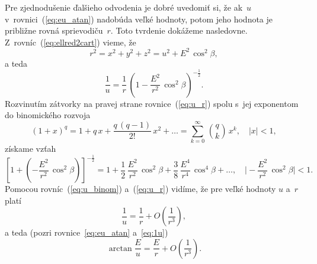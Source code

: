 \documentclass[a4paper, 12pt]{book}
\begin{document}
Pre zjednodušenie ďalšieho odvodenia je dobré uvedomiť si, že ak~$u$ 
v~rovnici~(\ref{eq:eu_atan}) nadobúda veľké hodnoty, potom jeho hodnota je 
približne rovná sprievodiču~$r$.  Toto tvrdenie dokážeme nasledovne.  
Z~rovníc~(\ref{eq:ellred2cart}) vieme, že
%
\begin{equation}
r^2 = x^2 + y^2 + z^2 = u^2 + E^2 \, \cos^2\beta{,}
\end{equation}
%
a teda
%
\begin{equation}
\label{eq:u_r}
\frac{1}{u} = \frac{1}{r} \, \left( 1 - \frac{E^2}{r^2} \, \cos^2\beta 
\right)^{-\frac{1}{2}}{.}
\end{equation}
%
Rozvinutím zátvorky na pravej strane rovnice~(\ref{eq:u_r}) spolu s~jej 
exponentom do binomického rozvoja \parencite[pozri napríklad][]{Gradshteyn2007}
%
\begin{equation}
(1 + x)^q = 1 + q \, x + \frac{q \, (q - 1)}{2!} \, x^2 + \dots = \sum_{k 
= 0}^{\infty} \, \binom{q}{k} \, x^k{,} \quad | x | < 1{,}
\end{equation}
%
získame vzťah
%
\begin{equation}
\label{eq:u_binom}
\left[ 1 + \left( - \frac{E^2}{r^2} \, \cos^2\beta \right) 
\right]^{-\frac{1}{2}} = 1 + \frac{1}{2} \, \frac{E^2}{r^2} \, \cos^2\beta 
+ \frac{3}{8} \, \frac{E^4}{r^4} \, \cos^4\beta + \dots{,} \quad \bigg\lvert 
-\frac{E^2}{r^2} \, \cos^2\beta \bigg\rvert < 1{.}
\end{equation}
%
Pomocou rovníc~(\ref{eq:u_binom}) a~(\ref{eq:u_r}) vidíme, že pre veľké hodnoty 
$u$ a~$r$ platí
%
\begin{equation}
\label{eq:1u}
\frac{1}{u} = \frac{1}{r} + O\left( \frac{1}{r^3} \right){,}
\end{equation}
%
a teda (pozri rovnice~\ref{eq:eu_atan} a~\ref{eq:1u})
%
\begin{equation}
\label{eq:arctan_eu_r}
\arctan\frac{E}{u} = \frac{E}{r} + O\left( \frac{1}{r^3} \right){.}
\end{equation}
\end{document}
